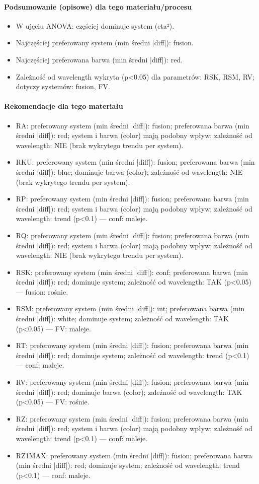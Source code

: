 \documentclass[
  10pt,
]{article}
\begin{document}
\paragraph{Podsumowanie (opisowe) dla tego materiału/procesu}
\begin{itemize}
\item W ujęciu ANOVA: częściej dominuje system (eta²).
\item Najczęściej preferowany system (min średni |diff|): fusion.
\item Najczęściej preferowana barwa (min średni |diff|): red.
\item Zależność od wavelength wykryta (p<0.05) dla parametrów: RSK, RSM, RV; dotyczy systemów: fusion, FV.
\end{itemize}
\paragraph{Rekomendacje dla tego materiału}
\begin{itemize}
\item RA: preferowany system (min średni |diff|): fusion; preferowana barwa (min średni |diff|): red; system i barwa (color) mają podobny wpływ; zależność od wavelength: NIE (brak wykrytego trendu per system).
\item RKU: preferowany system (min średni |diff|): fusion; preferowana barwa (min średni |diff|): blue; dominuje barwa (color); zależność od wavelength: NIE (brak wykrytego trendu per system).
\item RP: preferowany system (min średni |diff|): fusion; preferowana barwa (min średni |diff|): red; system i barwa (color) mają podobny wpływ; zależność od wavelength: trend (p<0.1) — conf: maleje.
\item RQ: preferowany system (min średni |diff|): fusion; preferowana barwa (min średni |diff|): red; system i barwa (color) mają podobny wpływ; zależność od wavelength: NIE (brak wykrytego trendu per system).
\item RSK: preferowany system (min średni |diff|): conf; preferowana barwa (min średni |diff|): red; dominuje system; zależność od wavelength: TAK (p<0.05) — fusion: rośnie.
\item RSM: preferowany system (min średni |diff|): int; preferowana barwa (min średni |diff|): white; dominuje system; zależność od wavelength: TAK (p<0.05) — FV: maleje.
\item RT: preferowany system (min średni |diff|): fusion; preferowana barwa (min średni |diff|): red; dominuje system; zależność od wavelength: trend (p<0.1) — conf: maleje.
\item RV: preferowany system (min średni |diff|): fusion; preferowana barwa (min średni |diff|): red; dominuje barwa (color); zależność od wavelength: TAK (p<0.05) — FV: rośnie.
\item RZ: preferowany system (min średni |diff|): fusion; preferowana barwa (min średni |diff|): red; system i barwa (color) mają podobny wpływ; zależność od wavelength: trend (p<0.1) — conf: maleje.
\item RZ1MAX: preferowany system (min średni |diff|): fusion; preferowana barwa (min średni |diff|): red; dominuje system; zależność od wavelength: trend (p<0.1) — conf: maleje.
\end{itemize}
\end{document}
